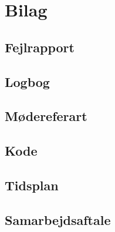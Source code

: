 \chapter{Bilag}
\section{Fejlrapport}



\section{Logbog}


\section{Mødereferart}


\section{Kode}

\section{Tidsplan}


\section{Samarbejdsaftale}
